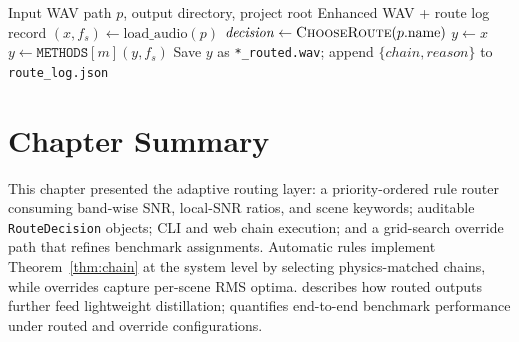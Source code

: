 \begin{algorithm}[H]
  \caption{Batch pipeline execution (\texttt{run\_pipeline.run\_one})}
  \label{alg:run_pipeline}
  \begin{algorithmic}[1]
    \Require Input WAV path $p$, output directory, project root
    \Ensure Enhanced WAV + route log record
    \State $(x, f_s) \gets \mathrm{load\_audio}(p)$
    \State $\mathit{decision} \gets \textsc{ChooseRoute}(p.\mathrm{name})$
    \State $y \gets x$
      \State $y \gets \texttt{METHODS}[m](y, f_s)$
    \EndFor
    \State Save $y$ as \texttt{*\_routed.wav}; append $\{\mathit{chain}, \mathit{reason}\}$ to \texttt{route\_log.json}
  \end{algorithmic}
\end{algorithm}

\section{Chapter Summary}
\label{sec:routing_summary}

This chapter presented the \projectshort{} adaptive routing layer: a priority-ordered rule router consuming band-wise SNR, local-SNR ratios, and scene keywords; auditable \texttt{RouteDecision} objects; CLI and web chain execution; and a grid-search override path that refines benchmark assignments. Automatic rules implement Theorem~\ref{thm:chain} at the system level by selecting physics-matched chains, while overrides capture per-scene RMS optima.  describes how routed outputs further feed lightweight distillation;  quantifies end-to-end benchmark performance under routed and override configurations.
